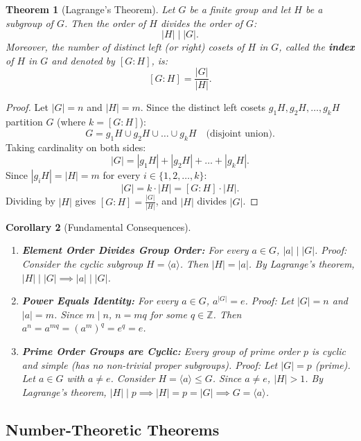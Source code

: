 \documentclass[12pt]{article}
\theoremstyle{definition}
\theoremstyle{plain}
\newtheorem{theorem}{Theorem}[section]
\newtheorem{corollary}[theorem]{Corollary}
\begin{document}
\begin{theorem}[Lagrange's Theorem]
Let $G$ be a finite group and let $H$ be a subgroup of $G$.
Then the order of $H$ divides the order of $G$:
\[
\boxed{|H| \mid |G|}.
\]
Moreover, the number of distinct left (or right) cosets of $H$ in $G$, called the \textbf{index} of $H$ in $G$ and denoted by $[G : H]$, is:
\[
\boxed{[G : H] = \frac{|G|}{|H|}}.
\]
\end{theorem}

\begin{proof}
Let $|G| = n$ and $|H| = m$.
Since the distinct left cosets $g_1 H, g_2 H, \dots, g_k H$ partition $G$ (where $k = [G : H]$):
\[
G = g_1 H \cup g_2 H \cup \dots \cup g_k H \quad \text{(disjoint union)}.
\]
Taking cardinality on both sides:
\[
|G| = |g_1 H| + |g_2 H| + \dots + |g_k H|.
\]
Since $|g_i H| = |H| = m$ for every $i \in \{1, 2, \dots, k\}$:
\[
|G| = k \cdot |H| = [G : H] \cdot |H|.
\]
Dividing by $|H|$ gives $[G : H] = \frac{|G|}{|H|}$, and $|H|$ divides $|G|$.
\end{proof}

\begin{corollary}[Fundamental Consequences]
\begin{enumerate}
    \item \textbf{Element Order Divides Group Order:} For every $a \in G$, $|a| \mid |G|$.
    \textit{Proof:} Consider the cyclic subgroup $H = \langle a \rangle$. Then $|H| = |a|$. By Lagrange's theorem, $|H| \mid |G| \implies |a| \mid |G|$.

    \item \textbf{Power Equals Identity:} For every $a \in G$, $a^{|G|} = e$.
    \textit{Proof:} Let $|G| = n$ and $|a| = m$. Since $m \mid n$, $n = mq$ for some $q \in \mathbb{Z}$.
    Then $a^n = a^{mq} = (a^m)^q = e^q = e$.

    \item \textbf{Prime Order Groups are Cyclic:} Every group of prime order $p$ is cyclic and simple (has no non-trivial proper subgroups).
    \textit{Proof:} Let $|G| = p$ (prime). Let $a \in G$ with $a \neq e$.
    Consider $H = \langle a \rangle \le G$. Since $a \neq e$, $|H| > 1$.
    By Lagrange's theorem, $|H| \mid p \implies |H| = p = |G| \implies G = \langle a \rangle$.
\end{enumerate}
\end{corollary}

\subsection{Number-Theoretic Theorems}
\end{document}
